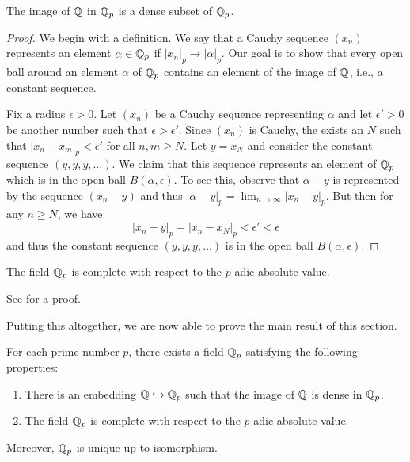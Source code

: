 \begin{lemmax}
    {\normalfont\cite[pp.~68--69]{gouvea1997p}} The image of \(\mathbb{Q}\) in
    \(\mathbb{Q}_p\) is a dense subset of \(\mathbb{Q}_p\).
\end{lemmax}

\begin{proof}
    We begin with a definition. We say that a Cauchy sequence \((x_n)\)
    represents an element \(\alpha \in \mathbb{Q}_p\) if \(|x_n|_p \to
    |\alpha|_p\). Our goal is to show that every open ball around an element
    \(\alpha\) of \(\mathbb{Q}_p\) contains an element of the image of
    \(\mathbb{Q}\), i.e., a constant sequence.
    
    Fix a radius \(\epsilon > 0\). Let \((x_n)\) be a Cauchy sequence
    representing \(\alpha\) and let \(\epsilon' > 0\) be another number such
    that \(\epsilon > \epsilon'\). Since \((x_n)\) is Cauchy, the exists an
    \(N\) such that \(|x_n - x_m|_p < \epsilon'\) for all \(n, m \geq N\). Let
    \(y = x_N\) and consider the constant sequence \((y, y, y, \dots)\). We
    claim that this sequence represents an element of \(\mathbb{Q}_p\) which is
    in the open ball \(B(\alpha, \epsilon)\). To see this, observe that \(\alpha
    - y\) is represented by the sequence \((x_n - y)\) and thus \(|\alpha - y|_p
    = \lim_{n \to \infty}|x_n - y|_p\). But then for any \(n \geq N\), we have
    \[|x_n - y|_p = |x_n - x_N|_p < \epsilon' < \epsilon\] and thus the constant
    sequence \((y, y, y, \dots)\) is in the open ball \(B(\alpha, \epsilon)\).
\end{proof}

\begin{lemmax}
    {\normalfont\cite[pp.~69--70]{gouvea1997p}} The field \(\mathbb{Q}_p\) is
    complete with respect to the \(p\)-adic absolute value.
\end{lemmax}

See \cite[pp.~69--70]{gouvea1997p} for a proof.

Putting this altogether, we are now able to prove the main result of this
section.

\begin{theoremx}
    {\normalfont\cite[pp.~70--71]{gouvea1997p}} For each prime number \(p\),
    there exists a field \(\mathbb{Q}_p\) satisfying the following properties:

    \smallskip

    \begin{enumerate}[nosep, label=(\alph*)]
        \item There is an embedding \(\mathbb{Q} \hookrightarrow \mathbb{Q}_p\)
        such that the image of \(\mathbb{Q}\) is dense in \(\mathbb{Q}_p\).
        \item The field \(\mathbb{Q}_p\) is complete with respect to the
        \(p\)-adic absolute value.
    \end{enumerate}

    \smallskip

    Moreover, \(\mathbb{Q}_p\) is unique up to isomorphism.
\end{theoremx}

